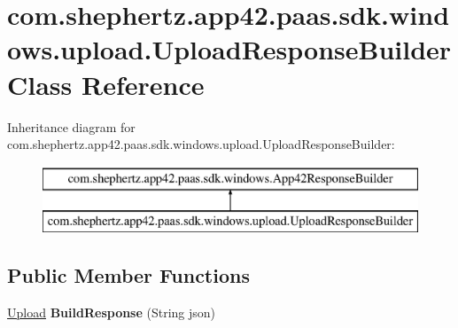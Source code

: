 \hypertarget{classcom_1_1shephertz_1_1app42_1_1paas_1_1sdk_1_1windows_1_1upload_1_1_upload_response_builder}{\section{com.\+shephertz.\+app42.\+paas.\+sdk.\+windows.\+upload.\+Upload\+Response\+Builder Class Reference}
\label{classcom_1_1shephertz_1_1app42_1_1paas_1_1sdk_1_1windows_1_1upload_1_1_upload_response_builder}
}
Inheritance diagram for com.\+shephertz.\+app42.\+paas.\+sdk.\+windows.\+upload.\+Upload\+Response\+Builder\+:\begin{figure}[H]
\begin{center}
\leavevmode
\includegraphics[height=2.000000cm]{classcom_1_1shephertz_1_1app42_1_1paas_1_1sdk_1_1windows_1_1upload_1_1_upload_response_builder}
\end{center}
\end{figure}
\subsection*{Public Member Functions}
\begin{DoxyCompactItemize}
\item 
\hypertarget{classcom_1_1shephertz_1_1app42_1_1paas_1_1sdk_1_1windows_1_1upload_1_1_upload_response_builder_ae0ac272f0a663e89e65ebbd6e7bd20ad}{\hyperlink{classcom_1_1shephertz_1_1app42_1_1paas_1_1sdk_1_1windows_1_1upload_1_1_upload}{Upload} {\bfseries Build\+Response} (String json)}\label{classcom_1_1shephertz_1_1app42_1_1paas_1_1sdk_1_1windows_1_1upload_1_1_upload_response_builder_ae0ac272f0a663e89e65ebbd6e7bd20ad}

\end{DoxyCompactItemize}
